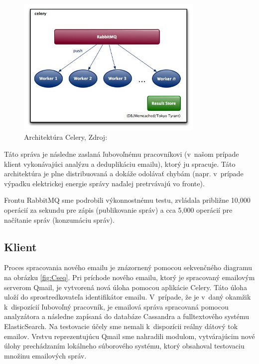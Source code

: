 \documentclass[11pt,twoside,a4paper]{book}
\begin{document}
\begin{figure}[h]
 \centering
 \includegraphics[width=9cm]{./figures/Celery.jpg}
 \caption{Architektúra Celery, Zdroj: \cite{celery}}
 \label{fig:Celery}
\end{figure}
Táto správa je následne zaslaná ľubovoľnému pracovníkovi (v~našom prípade klient vykonávajúci analýzu a deduplikáciu emailu), ktorý ju spracuje. Táto architektúra je plne distribuovaná a dokáže odolávať chybám (napr. v~prípade výpadku elektrickej energie správy naďalej pretrvávajú vo fronte).


Frontu RabbitMQ sme podrobili výkonnostnému testu, zvládala približne 10,000 operácií za sekundu pre zápis (publikovanie správ) a cca 5,000 operácií pre načítanie správ (konzumáciu správ).

\subsection{Klient}

Proces spracovania nového emailu je znázornený pomocou sekvenčného diagramu na obrázku \ref{fig:Cseq}. Pri príchode nového emailu, ktorý je spracovaný emailovým serverom Qmail, je vytvorená nová úloha pomocou aplikácie Celery. Táto úloha uloží do sprostredkovateľa identifikátor emailu. V~prípade, že je v~daný okamžik k~dispozícií ľubovoľný pracovník, je emailová správa spracovaná pomocou analyzátora a následne zapísaná do databáze Cassandra a fulltextového systému ElasticSearch. Na testovacie účely sme nemali k~dispozícii reálny dátový tok emailov. Vrstvu reprezentujúcu Qmail sme nahradili modulom, vytvárajúcim nové úlohy prechádzaním lokálneho súborového systému, ktorý obsahoval testovaciu množinu emailových správ.
\end{document}
